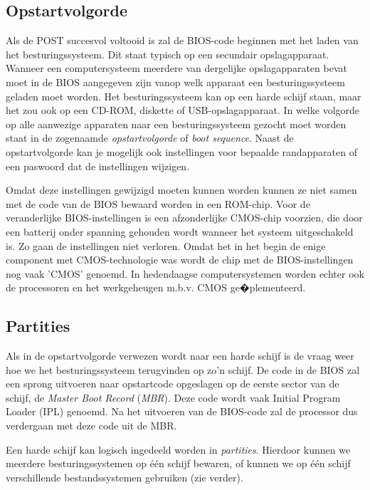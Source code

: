 \subsection{Opstartvolgorde}

Als de POST succesvol voltooid is zal de BIOS-code beginnen met
het laden van het besturingssysteem. Dit staat typisch op een
secundair opslagapparaat. Wanneer een computersysteem meerdere van
dergelijke opslagapparaten bevat moet in de BIOS aangegeven zijn vanop
welk apparaat een besturingssysteem geladen moet worden. Het
besturingssysteem kan op een harde schijf staan, maar het zou ook op
een CD-ROM, diskette of USB-opslagapparaat. In welke volgorde op alle
aanwezige apparaten naar een besturingssysteem gezocht moet worden
staat in de zogenaamde \emph{opstartvolgorde} of
\emph{boot sequence}. Naast de opstartvolgorde kan je
mogelijk ook instellingen voor bepaalde randapparaten of een paswoord
dat de instellingen wijzigen.

Omdat deze instellingen gewijzigd moeten kunnen worden kunnen ze
niet samen met de code van de BIOS bewaard worden in een ROM-chip.
Voor de veranderlijke BIOS-instellingen is een afzonderlijke CMOS-chip
voorzien, die door een batterij onder spanning gehouden wordt wanneer
het systeem uitgeschakeld is. Zo gaan de instellingen niet verloren.
Omdat het in het begin de enige component met CMOS-technologie was
wordt de chip met de BIOS-instellingen nog vaak 'CMOS' genoemd. In
hedendaagse computersystemen worden echter ook de processoren en het
werkgeheugen m.b.v. CMOS ge�plementeerd.

\subsection{Partities}

Als in de opstartvolgorde verwezen wordt naar een harde schijf
is de vraag weer hoe we het besturingssysteem terugvinden op zo'n
schijf. De code in de BIOS zal een sprong uitvoeren naar opstartcode
opgeslagen op de eerste sector van de schijf, de \emph{Master
Boot Record} (\emph{MBR}). Deze code wordt
vaak Initial Program Loader (IPL) genoemd. Na het uitvoeren van de
BIOS-code zal de processor dus verdergaan met deze code uit de
MBR.

Een harde schijf kan logisch ingedeeld worden in
\emph{partities}. Hierdoor kunnen we meerdere
besturingssystemen op \'e\'en schijf bewaren, of kunnen we op \'e\'en schijf
verschillende bestandssystemen gebruiken (zie verder).

